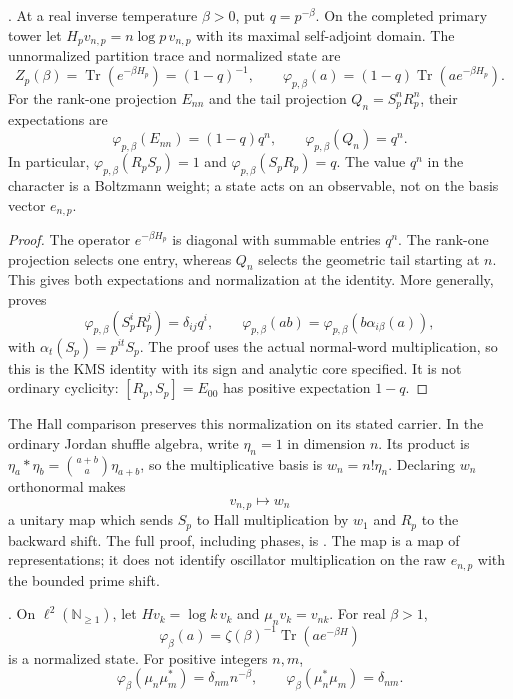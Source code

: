 \begin{proposition}
\label{v4-arith:prim-zeta:prop:BC-ergodic}
\ClaimStatusProvedHere. At a real inverse temperature $\beta>0$,
put $q=p^{-\beta}$. On the completed primary tower let
$H_pv_{n,p}=n\log p\,v_{n,p}$ with its maximal self-adjoint
domain. The unnormalized partition trace and normalized state are
\[
 Z_p(\beta)=\operatorname{Tr}(e^{-\beta H_p})=(1-q)^{-1},
 \qquad \varphi_{p,\beta}(a)=(1-q)
                 \operatorname{Tr}(a e^{-\beta H_p}).
\]
For the rank-one projection $E_{nn}$ and the tail projection
$Q_n=S_p^nR_p^n$, their expectations are
\[
 \varphi_{p,\beta}(E_{nn})=(1-q)q^n,
 \qquad \varphi_{p,\beta}(Q_n)=q^n.
\]
In particular,
$\varphi_{p,\beta}(R_pS_p)=1$ and
$\varphi_{p,\beta}(S_pR_p)=q$.
The value $q^n$ in the character is a Boltzmann weight; a state
acts on an observable, not on the basis vector $e_{n,p}$.
\end{proposition}

\begin{proof}
The operator $e^{-\beta H_p}$ is diagonal with summable
entries $q^n$. The rank-one projection selects one entry, whereas
$Q_n$ selects the geometric tail starting at $n$. This gives both
expectations and normalization at the identity. More generally,
 proves
\[
 \varphi_{p,\beta}(S_p^iR_p^j)=\delta_{ij}q^i,
 \qquad
 \varphi_{p,\beta}(ab)
    =\varphi_{p,\beta}(b\alpha_{i\beta}(a)),
\]
with $\alpha_t(S_p)=p^{it}S_p$. The proof uses the actual
normal-word multiplication, so this is the KMS identity with
its sign and analytic core specified. It is not ordinary cyclicity:
$[R_p,S_p]=E_{00}$ has positive expectation $1-q$.
\end{proof}

The Hall comparison preserves this normalization on its stated
carrier. In the ordinary Jordan shuffle algebra, write
$\eta_n=1$ in dimension $n$. Its product is
$\eta_a*\eta_b=\binom{a+b}{a}\eta_{a+b}$, so the multiplicative
basis is $w_n=n!\eta_n$. Declaring $w_n$ orthonormal makes
\[
 v_{n,p}\longmapsto w_n
\]
a unitary map which sends $S_p$ to Hall multiplication by $w_1$
and $R_p$ to the backward shift. The full proof, including phases,
is . The map is a map of
representations; it does not identify oscillator multiplication
on the raw $e_{n,p}$ with the bounded prime shift.

\begin{proposition}
\label{v4-arith:prim-zeta:global-shift-state}
\ClaimStatusProvedHere. On $\ell^2(\mathbb N_{\geq1})$, let
$Hv_k=\log k\,v_k$ and $\mu_nv_k=v_{nk}$. For real $\beta>1$,
\[
 \varphi_\beta(a)=\zeta(\beta)^{-1}
                    \operatorname{Tr}(a e^{-\beta H})
\]
is a normalized state. For positive integers $n,m$,
\begin{equation}
 \varphi_\beta(\mu_n\mu_m^*)=\delta_{nm}n^{-\beta},
 \qquad
 \varphi_\beta(\mu_n^*\mu_m)=\delta_{nm}.
 \label{v4-arith:prim-zeta:global-shift-expectations}
\end{equation}
\end{proposition}

